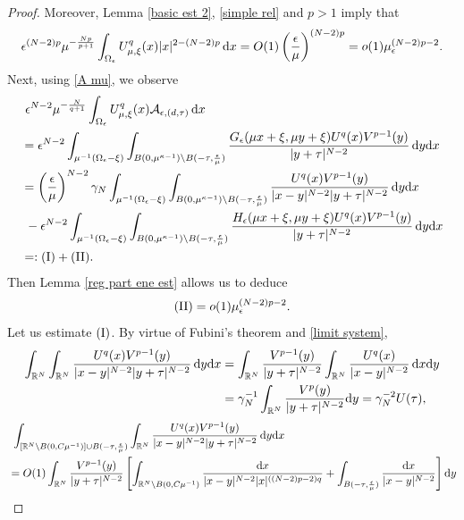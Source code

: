 \documentclass[reqno]{amsart}
\theoremstyle{remark}
\newcommand{\ep}{\epsilon}
\newcommand{\ga}{\gamma}
\newcommand{\R}{\mathbb{R}}
\newcommand{\mca}{\mathcal{A}}
\newcommand{\dx}{\textup{d}x}
\newcommand{\dy}{\textup{d}y}
\newcommand{\mx}{{\mu,\xi}}
\renewcommand{\(}{\left(}
\renewcommand{\)}{\right)}
\numberwithin{equation}{section}
\begin{document}
\begin{proof}
Moreover, Lemma \ref{basic est 2}, \eqref{simple rel} and $p > 1$ imply that
\begin{equation}\label{second term est2}
\ep^{(N-2)p}\mu^{-\frac{Np}{p+1}} \int_{\Omega_\ep} U_\mx^q(x)|x|^{2-(N-2)p}\, \dx = O(1)\(\frac{\ep}{\mu}\)^{(N-2)p} = o(1)\mu_\ep^{(N-2)p-2}.
\end{equation}
Next, using \eqref{A mu}, we observe
\begin{equation}\label{a mu est}
\begin{aligned}
&\ \ep^{N-2}\mu^{-\frac{N}{q+1}} \int_{\Omega_\ep} U_\mx^q(x) \mca_{\ep,(d,\tau)}\, \dx \\
&=\ep^{N-2} \int_{\mu^{-1}(\Omega_\ep-\xi)} \int_{B(0,\mu^{\kappa-1})\setminus B(-\tau,\frac{\ep}{\mu})} \frac{G_\ep(\mu x+\xi,\mu y+\xi)U^q(x) V^{p-1}(y)}{|y+\tau|^{N-2}}\, \dy\dx \\
&=\(\frac{\ep}{\mu}\)^{N-2} \ga_N\int_{\mu^{-1}(\Omega_\ep-\xi)} \int_{B(0,\mu^{\kappa-1})\setminus B(-\tau,\frac{\ep}{\mu})} \frac{U^q(x) V^{p-1}(y)}{|x-y|^{N-2} |y+\tau|^{N-2}}\, \dy\dx \\
&\ - \ep^{N-2} \int_{\mu^{-1}(\Omega_\ep-\xi)} \int_{B(0,\mu^{\kappa-1})\setminus B(-\tau,\frac{\ep}{\mu})} \frac{H_\ep(\mu x+\xi,\mu y+\xi)U^q(x) V^{p-1}(y)}{|y+\tau|^{N-2}}\, \dy\dx \\
&=: \textup{(I)}+\textup{(II)}.
\end{aligned}
\end{equation}
Then Lemma \ref{reg part ene est} allows us to deduce
\begin{equation}\label{a mu est1}
\textup{(II)} = o(1)\mu_\ep^{(N-2)p-2}.
\end{equation}
Let us estimate $\textup{(I)}$. By virtue of Fubini's theorem and \eqref{limit system},
\begin{align*}
\int_{\R^N} \int_{\R^N} \frac{U^q(x) V^{p-1}(y)}{|x-y|^{N-2} |y+\tau|^{N-2}}\, \dy\dx &= \int_{\R^N} \frac{V^{p-1}(y)}{|y+\tau|^{N-2}}\int_{\R^N} \frac{U^q(x)}{|x-y|^{N-2}}\, \dx\dy\\
&= \ga_N^{-1}\int_{\R^N} \frac{V^p(y)}{|y+\tau|^{N-2}} \dy = \ga_N^{-2}U(\tau),
\end{align*}
\begin{align*}
&\ \int_{\left[\R^N\setminus B(0,C\mu^{-1})\right] \cup B(-\tau,\frac{\ep}{\mu})} \int_{\R^N} \frac{U^q(x) V^{p-1}(y)}{|x-y|^{N-2} |y+\tau|^{N-2}}\, \dy\dx\\
&= O(1)\int_{\R^N} \frac{V^{p-1}(y)}{|y+\tau|^{N-2}} \left[\int_{\R^N\setminus B(0,C\mu^{-1})} \frac{\dx}{|x-y|^{N-2}|x|^{((N-2)p-2)q}} + \int_{B(-\tau,\frac{\ep}{\mu})} \frac{\dx}{|x-y|^{N-2}} \right] \dy\\

\end{align*}
\end{proof}
\end{document}
